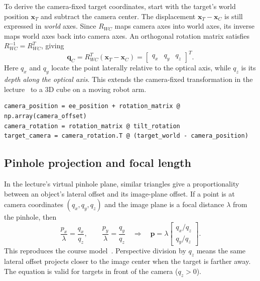 \documentclass[11pt,letterpaper]{article}
\begin{document}
To derive the camera-fixed target coordinates, start with the target's world position $\mathbf{x}_T$ and subtract the camera center. The displacement $\mathbf{x}_T-\mathbf{x}_C$ is still expressed in \emph{world} axes. Since $R_{WC}$ maps camera axes into world axes, its inverse maps world axes back into camera axes. An orthogonal rotation matrix satisfies $R_{WC}^{-1}=R_{WC}^{T}$, giving
\begin{equation}
\boxed{\mathbf{q}_C=R_{WC}^{T}(\mathbf{x}_T-\mathbf{x}_C)
=\begin{bmatrix}q_x&q_y&q_z\end{bmatrix}^{T}.}\label{eq:camera_coords}
\end{equation}
Here $q_x$ and $q_y$ locate the point laterally relative to the optical axis, while $q_z$ is its \emph{depth along the optical axis}. This extends the camera-fixed transformation in the lecture~\cite[Eq.~(4)]{ferrari} to a 3D cube on a moving robot arm.

\begin{lstlisting}[caption={Camera mounting and world-to-camera coordinates.},label={lst:frames}]
camera_position = ee_position + rotation_matrix @ np.array(camera_offset)
camera_rotation = rotation_matrix @ tilt_rotation
target_camera = camera_rotation.T @ (target_world - camera_position)
\end{lstlisting}

\subsection{Pinhole projection and focal length}
In the lecture's virtual pinhole plane, similar triangles give a proportionality between an object's lateral offset and its image-plane offset. If a point is at camera coordinates $(q_x,q_y,q_z)$ and the image plane is a focal distance $\lambda$ from the pinhole, then
\begin{equation}
\frac{p_x}{\lambda}=\frac{q_x}{q_z},\qquad
\frac{p_y}{\lambda}=\frac{q_y}{q_z}\quad\Longrightarrow\quad
\boxed{\mathbf{p}=\lambda\begin{bmatrix}q_x/q_z\\q_y/q_z\end{bmatrix}.}\label{eq:lecture_proj}
\end{equation}
This reproduces the course model~\cite[Eq.~(3)]{ferrari}. Perspective division by $q_z$ means the same lateral offset projects closer to the image center when the target is farther away. The equation is valid for targets in front of the camera ($q_z>0$).
\end{document}
